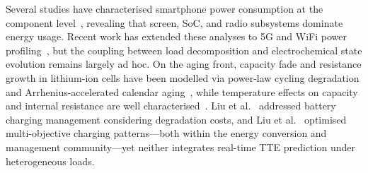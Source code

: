 \documentclass[5p,times,number]{elsarticle}
\begin{document}
Several studies have characterised smartphone power consumption at the component level~\cite{Carroll2010,Chen2014,Murmuria2012}, revealing that screen, SoC, and radio subsystems dominate energy usage.
Recent work has extended these analyses to 5G and WiFi power profiling~\cite{Xu2020,Lauridsen2014,Sun2018,Negri2006}, but the coupling between load decomposition and electrochemical state evolution remains largely ad hoc.
On the aging front, capacity fade and resistance growth in lithium-ion cells have been modelled via power-law cycling degradation and Arrhenius-accelerated calendar aging~\cite{Vetter2005,Whittingham2012,Li2019,Kou2017}, while temperature effects on capacity and internal resistance are well characterised~\cite{Ali2020,Chen2025,He2017,Tang2019ECM}.
Liu et al.~\cite{Liu2019ECM} addressed battery charging management considering degradation costs, and Liu et al.~\cite{Liu2018ECM} optimised multi-objective charging patterns---both within the energy conversion and management community---yet neither integrates real-time TTE prediction under heterogeneous loads.
\end{document}
